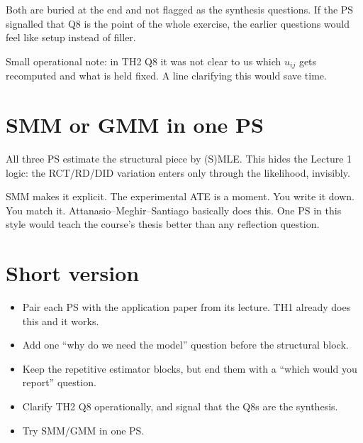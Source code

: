 \documentclass[11pt]{article}
\begin{document}
Both are buried at the end and not flagged as the synthesis questions. If the PS signalled that Q8 is the point of the whole exercise, the earlier questions would feel like setup instead of filler.

Small operational note: in TH2 Q8 it was not clear to us which $u_{ij}$ gets recomputed and what is held fixed. A line clarifying this would save time.

\section*{SMM or GMM in one PS}
All three PS estimate the structural piece by (S)MLE. This hides the Lecture 1 logic: the RCT/RD/DID variation enters only through the likelihood, invisibly.

SMM makes it explicit. The experimental ATE is a moment. You write it down. You match it. Attanasio--Meghir--Santiago basically does this. One PS in this style would teach the course's thesis better than any reflection question.

\section*{Short version}
\begin{itemize}
    \item Pair each PS with the application paper from its lecture. TH1 already does this and it works.
    \item Add one ``why do we need the model'' question before the structural block.
    \item Keep the repetitive estimator blocks, but end them with a ``which would you report'' question.
    \item Clarify TH2 Q8 operationally, and signal that the Q8s are the synthesis.
    \item Try SMM/GMM in one PS.
\end{itemize}
\end{document}
